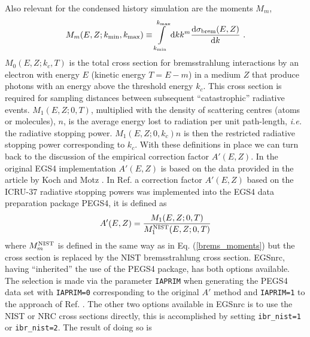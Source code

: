 Also relevant for the condensed history simulation are the
moments $M_m$,
\begin{equation}
\label{brems_moments}
M_m(E,Z; k_{\rm min},k_{\rm max}) \equiv
\int\limits_{k_{\rm min}}^{k_{\rm max}} {\rm d}k k^m
{{\rm d} \sigma_{\rm brem}(E,Z) \over {\rm d} k}~.
\end{equation}
$M_0(E,Z;k_c,T)$ is the total cross section for bremsstrahlung
interactions by an electron with energy $E$ (kinetic energy
$T=E-m$) in a medium $Z$
that produce photons with an energy above the
threshold energy $k_c$. This cross section is required for
sampling distances between subsequent ``catastrophic'' radiative
events. $M_1(E,Z;0,T)$, multiplied with the density of scattering
centres (atoms or molecules), $n$,
is the average energy lost to radiation per unit path-length,
{\em i.e.} the radiative stopping power. $M_1(E,Z;0,k_c) n$ is then
the restricted radiative stopping power corresponding to $k_c$.
With these definitions in place we can turn back to the
discussion of the empirical correction factor $A'(E,Z)$.
In the original EGS4 implementation $A'(E,Z)$ is based on the
data provided in the article by Koch and Motz \cite{KM59}.
In Ref. \cite{Ro89a} a correction factor $A'(E,Z)$ based
on the ICRU-37 radiative stopping powers was implemented
into the EGS4 data preparation package PEGS4, it is defined as
\begin{equation}
\label{brems_aprime}
A'(E,Z) = {M_1(E,Z;0,T) \over M_1^{\rm NIST}(E,Z;0,T)}
\end{equation}
where $M_m^{\rm NIST}$ is defined in the same way as
in Eq. (\ref{brems_moments}) but the cross section is replaced
by the NIST bremsstrahlung cross section.
EGSnrc, having ``inherited'' the use of the PEGS4 package,
has both options available. The selection is made via
the parameter {\tt IAPRIM} when generating the PEGS4 data
set with {\tt IAPRIM=0} corresponding to the original
$A'$ method and {\tt IAPRIM=1} to the approach of Ref. \cite{Ro89a}.
The other two options available in EGSnrc is to use the NIST or NRC cross sections
directly, this is accomplished by setting {\tt ibr\_nist=1} or {\tt ibr\_nist=2}.
The result of doing so is
